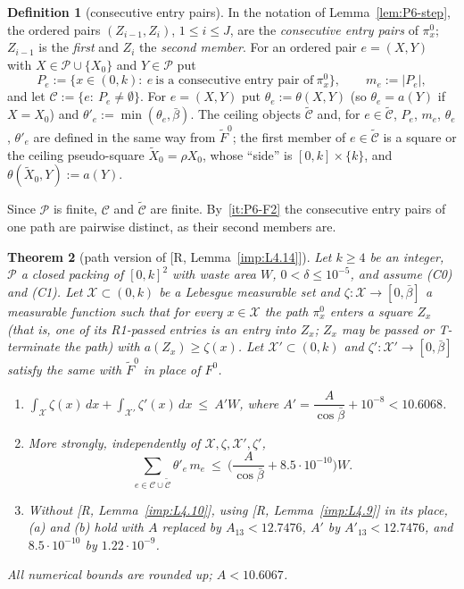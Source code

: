 \documentclass[11pt]{amsart}
\newcommand{\cP}{\mathcal P}
\newcommand{\cX}{\mathcal X}
\newcommand{\bbar}{\bar\beta}
\newcommand{\Fz}{F^{0}}
\newtheorem{theorem}{Theorem}[section]
\theoremstyle{definition}
\newtheorem{definition}[theorem]{Definition}
\theoremstyle{remark}
\numberwithin{equation}{section}
\begin{document}
\begin{definition}[consecutive entry pairs]\label{def:P6-pairs}
In the notation of Lemma~\ref{lem:P6-step}, the ordered pairs $(Z_{i-1},Z_i)$, $1\le i\le J$, are the
\emph{consecutive entry pairs} of $\pi^0_x$; $Z_{i-1}$ is the \emph{first} and $Z_i$ the \emph{second member}. For
an ordered pair $e=(X,Y)$ with $X\in\cP\cup\{X_0\}$ and $Y\in\cP$ put
\[
P_e:=\{x\in(0,k):\ e\ \text{is a consecutive entry pair of}\ \pi^0_x\},\qquad m_e:=|P_e|,
\]
and let $\mathcal C:=\{e:\ P_e\neq\emptyset\}$. For $e=(X,Y)$ put $\theta_e:=\theta(X,Y)$ (so $\theta_e=a(Y)$ if
$X=X_0$) and $\theta'_e:=\min(\theta_e,\bbar)$. The ceiling objects $\tilde{\mathcal C}$ and, for
$e\in\tilde{\mathcal C}$, $P_e$, $m_e$, $\theta_e$, $\theta'_e$ are defined in the same way from $\tilde F^0$; the
first member of $e\in\tilde{\mathcal C}$ is a square or the ceiling pseudo-square $\tilde X_0=\rho X_0$, whose
``side'' is $[0,k]\times\{k\}$, and $\theta(\tilde X_0,Y):=a(Y)$.
\end{definition}

Since $\cP$ is finite, $\mathcal C$ and $\tilde{\mathcal C}$ are finite. By~\ref{it:P6-F2} the consecutive entry
pairs of one path are pairwise distinct, as their second members are.

\begin{theorem}[path version of {[R, Lemma~\ref{imp:L4.14}]}]\label{thm:P6}
Let $k\ge4$ be an integer, $\cP$ a closed packing of $[0,k]^2$ with waste area $W$, $0<\delta\le10^{-5}$, and
assume \textup{(C0)} and \textup{(C1)}. Let $\cX\subset(0,k)$ be a Lebesgue measurable set and $\zeta:\cX\to[0,\bbar]$
a measurable function such that for every $x\in\cX$ the path $\pi^0_x$ enters a square $Z_x$ \textup{(}that is, one
of its R1-passed entries is an entry into $Z_x$; $Z_x$ may be passed or T-terminate the path\textup{)} with
$a(Z_x)\ge\zeta(x)$. Let $\cX'\subset(0,k)$ and $\zeta':\cX'\to[0,\bbar]$ satisfy the same with $\tilde F^0$ in place
of $\Fz$.
\begin{enumerate}[label=(\alph*)]
\item $\displaystyle\int_{\cX}\zeta(x)\,dx+\int_{\cX'}\zeta'(x)\,dx\ \le\ A'W$, where $A'=\dfrac{A}{\cos\bbar}+10^{-8}<10.6068$.
\item More strongly, independently of $\cX,\zeta,\cX',\zeta'$,
\[
\sum_{e\in\mathcal C\cup\tilde{\mathcal C}}\theta'_e\,m_e\ \le\ \Big(\frac{A}{\cos\bbar}+8.5\cdot10^{-10}\Big)W .
\]
\item Without [R, Lemma~\ref{imp:L4.10}], using [R, Lemma~\ref{imp:L4.9}] in its place, \textup{(a)} and \textup{(b)}
hold with $A$ replaced by $A_{13}<12.7476$, $A'$ by $A'_{13}<12.7476$, and $8.5\cdot10^{-10}$ by $1.22\cdot10^{-9}$.
\end{enumerate}
All numerical bounds are rounded up; $A<10.6067$.
\end{theorem}
\end{document}
